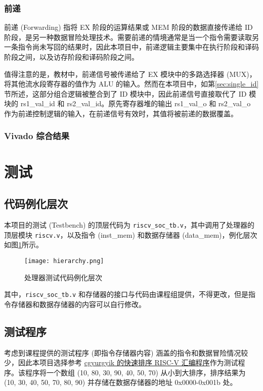 \documentclass[lang=zh]{sjtuarticle}	%
\begin{document}
\subsubsection{前递}

前递 (Forwarding) 指将 EX 阶段的运算结果或 MEM 阶段的数据直接传递给 ID 阶段，是另一种数据冒险处理技术。需要前递的情境通常是当一个指令需要读取另一条指令尚未写回的结果时，因此本项目中，前递逻辑主要集中在执行阶段和译码阶段之间，以及访存阶段和译码阶段之间。

值得注意的是，教材\cite{COD}中，前递信号被传递给了 EX 模块中的多路选择器 (MUX)，将其他流水段寄存器的值作为 ALU 的输入。然而在本项目中，如第\ref{sec:single_id}节所述，这部分组合逻辑被整合到了 ID 模块中，因此前递信号直接取代了 ID 模块的 rs1\_val\_id 和 rs2\_val\_id。原先寄存器堆的输出 rs1\_val\_o 和 rs2\_val\_o 作为前递控制逻辑的输入，在前递信号有效时，其值将被前递的数据覆盖。

\subsubsection{Vivado 综合结果}

\section{测试}

\subsection{代码例化层次}

本项目的测试 (Testbench) 的顶层代码为 \texttt{riscv\_soc\_tb.v}，其中调用了处理器的顶层模块 \texttt{riscv.v}，以及指令 (inst\_mem) 和数据存储器 (data\_mem)，例化层次如图\ref{fig:hierarchy}所示。

\begin{figure}[!htp]
	\centering
	\texttt{[image: hierarchy.png]}
	\caption{处理器测试代码例化层次}
	\label{fig:hierarchy}
\end{figure}

其中，\texttt{riscv\_soc\_tb.v} 和存储器的接口与代码由课程组提供，不得更改，但是指令存储器和数据存储器的内容可以自行修改。

\subsection{测试程序}

考虑到课程提供的测试程序 (即指令存储器内容) 涵盖的指令和数据冒险情况较少，因此本项目选择参考 \href{https://github.com/cgyurgyik/riscv-assembly/blob/master/quicksort.s}{cgyurgyik 的快速排序 RISC-V 汇编程序}作为测试程序。该程序将一个数组 (10, 80, 30, 90, 40, 50, 70) 从小到大排序，排序结果为 (10, 30, 40, 50, 70, 80, 90) 并存储在数据存储器的地址 0x0000-0x001b 处。
\end{document}
